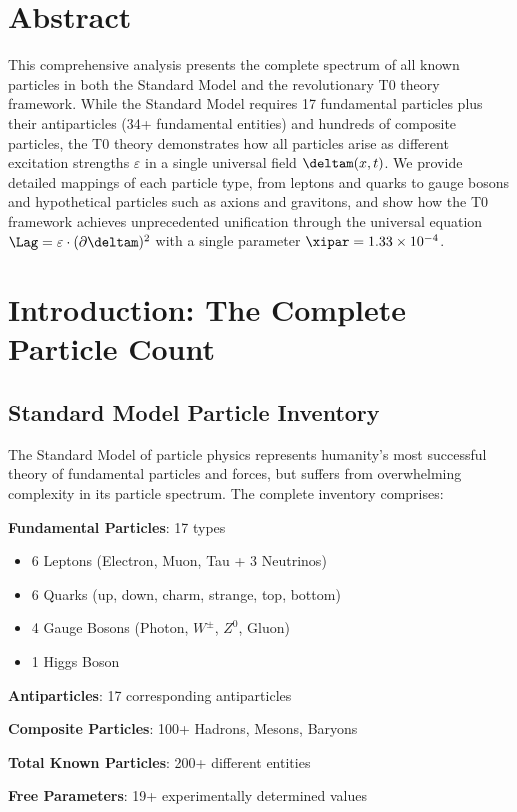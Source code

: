 \section*{Abstract}
		This comprehensive analysis presents the complete spectrum of all known particles in both the Standard Model and the revolutionary T0 theory framework. While the Standard Model requires 17 fundamental particles plus their antiparticles (34+ fundamental entities) and hundreds of composite particles, the T0 theory demonstrates how all particles arise as different excitation strengths $\varepsilon$ in a single universal field $\deltam(x,t)$. We provide detailed mappings of each particle type, from leptons and quarks to gauge bosons and hypothetical particles such as axions and gravitons, and show how the T0 framework achieves unprecedented unification through the universal equation $\Lag = \varepsilon \cdot (\partial \deltam)^2$ with a single parameter $\xipar = 1.33 \times 10^{-4}$.

	
	
	\section{Introduction: The Complete Particle Count}
	
	\subsection{Standard Model Particle Inventory}
	
	The Standard Model of particle physics represents humanity's most successful theory of fundamental particles and forces, but suffers from overwhelming complexity in its particle spectrum. The complete inventory comprises:
	
	\begin{tcolorbox}[colback=red!5!white,colframe=red!75!black,title=Standard Model Complexity Crisis]
		\textbf{Fundamental Particles}: 17 types
		\begin{itemize}
			\item 6 Leptons (Electron, Muon, Tau + 3 Neutrinos)
			\item 6 Quarks (up, down, charm, strange, top, bottom)
			\item 4 Gauge Bosons (Photon, $W^{\pm}$, $Z^0$, Gluon)
			\item 1 Higgs Boson
		\end{itemize}
		
		\textbf{Antiparticles}: 17 corresponding antiparticles
		
		\textbf{Composite Particles}: 100+ Hadrons, Mesons, Baryons
		
		\textbf{Total Known Particles}: 200+ different entities
		
		\textbf{Free Parameters}: 19+ experimentally determined values
	\end{tcolorbox}
	
